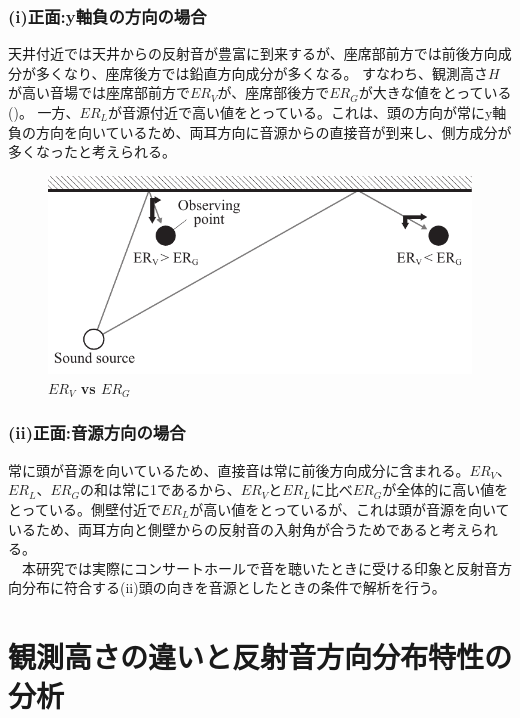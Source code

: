 \subsubsection{(i)正面:y軸負の方向の場合}
天井付近では天井からの反射音が豊富に到来するが、座席部前方では前後方向成分が多くなり、座席後方では鉛直方向成分が多くなる。
すなわち、観測高さ$H$が高い音場では座席部前方で$ER_V$が、座席部後方で$ER_G$が大きな値をとっている()。
一方、$ER_L$が音源付近で高い値をとっている。これは、頭の方向が常にy軸負の方向を向いているため、両耳方向に音源からの直接音が到来し、側方成分が多くなったと考えられる。
\\
\begin{figure}[htbp]
    \centering
    \includegraphics[keepaspectratio,scale=1]{05_att/er_reason.pdf}
    \caption{\hspace{1mm}\textbf{$ER_V$ vs $ER_G$}}
    \label{fig:er_reason}
\end{figure}

\subsubsection{(ii)正面:音源方向の場合}
常に頭が音源を向いているため、直接音は常に前後方向成分に含まれる。$ER_V$、$ER_L$、$ER_G$の和は常に1であるから、$ER_V$と$ER_L$に比べ$ER_G$が全体的に高い値をとっている。側壁付近で$ER_L$が高い値をとっているが、これは頭が音源を向いているため、両耳方向と側壁からの反射音の入射角が合うためであると考えられる。
\\　本研究では実際にコンサートホールで音を聴いたときに受ける印象と反射音方向分布に符合する(ii)頭の向きを音源としたときの条件で解析を行う。
\pagebreak

\section{観測高さの違いと反射音方向分布特性の分析}


